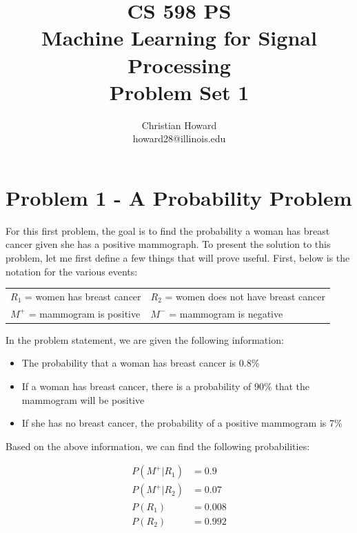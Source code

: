 \documentclass{article}[12pt]
\title{CS 598 PS \\ Machine Learning for Signal Processing \\ Problem Set 1}
\author{
Christian Howard \\ howard28@illinois.edu
}
\date{} %
\begin{document}
   
   \maketitle
   \newpage
   
   \tableofcontents
   \newpage
   
   \section{Problem 1 - A Probability Problem}
   For this first problem, the goal is to find the probability a woman has breast cancer given she has a positive mammograph. To present the solution to this problem, let me first define a few things that will prove useful. First, below is the notation for the various events:
   
   \vspace{10pt}
   \begin{tabular}{l l}
   $R_1$ = women has breast cancer & $R_2$ = women does not have breast cancer \\
   $M^{+}$ = mammogram is positive & $M^{-}$ = mammogram is negative
   \end{tabular}
   \vspace{10pt}   
   
   In the problem statement, we are given the following information:
   
   \begin{itemize}
   \item The probability that a woman has breast cancer is 0.8\%
   \item If a woman has breast cancer, there is a probability of 90\% that the mammogram will be positive
   \item If she has no breast cancer, the probability of a positive mammogram is 7\%
   \end{itemize}
   
   Based on the above information, we can find the following probabilities:
   
   \begin{align*}
   P(M^{+} | R_1) &= 0.9 \\
   P(M^{+} | R_2) &= 0.07 \\
   P(R_1) &= 0.008 \\
   P(R_2) &= 0.992
   \end{align*}
   
\end{document}

